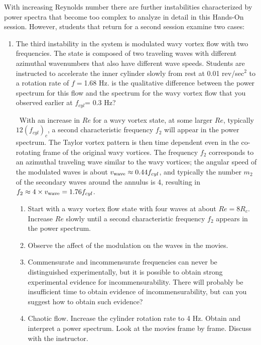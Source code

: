 \documentclass[%
 amsmath,amssymb,
 aps,
floatfix,
aps,prd,longbibliography,
notitlepage
]{revtex4-1}
\begin{document}
With increasing Reynolds number there are further instabilities characterized by power spectra that become too complex to analyze in detail in this Hands-On session.  However, students that return for a second session examine two cases: 

\begin{enumerate}

\item The third instability in the system is modulated wavy vortex flow with two frequencies. The state is composed of two traveling waves with different azimuthal wavenumbers that also have different wave speeds. Students are instructed to accelerate the inner cylinder slowly from rest at 0.01 rev/sec$^2$ to a rotation rate of $f=$1.68 Hz.    is the qualitative  difference between the power spectrum for this flow and the spectrum for the wavy vortex flow that you observed earlier at $f_{cyl}$= 0.3 Hz?  



\
With an increase in $Re$ for a wavy vortex state, at some larger $Re$, typically $12( f_{cyl})_c$, a second characteristic frequency $f_2$ will appear in the power spectrum. The Taylor vortex pattern is then time dependent even in the co-rotating frame of the original wavy vortices.  The frequency $f_2$ corresponds to an azimuthal traveling wave similar to the wavy vortices; the angular speed of the modulated waves is about $v_{\rm wave}\approx0.44f_{cyl}$, and typically the number $m_2$ of the secondary waves around the annulus is 4, resulting in $f_2 \approx 4\times v_{\rm wave}= 1.76 f_{cyl}$.  

\begin{enumerate}
\item  Start with a wavy vortex flow state with four waves at about $Re=8R_c$.  Increase $Re$ slowly until a second characteristic frequency $f_2$ appears in the power spectrum.  
\item  Observe the affect of the modulation on the waves in the movies.
\item  Commensurate and incommensurate frequencies can never be distinguished experimentally, but it is possible to obtain strong experimental evidence for incommensurability.  There will probably be insufficient time to obtain evidence of incommensurability, but can you suggest how to obtain such evidence?
\item Chaotic flow.  Increase the cylinder rotation rate to 4 Hz.  Obtain and interpret a power spectrum.  Look at the movies frame by frame. Discuss with the instructor.
\end{enumerate}
\end{enumerate}
\end{document}
